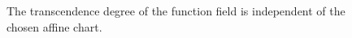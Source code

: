 \begin{figure}[htbp]\centering
{}
\caption{The transcendence degree of the function field is independent of the chosen affine chart.}\label{fig:vi27-trdeg}\end{figure}
